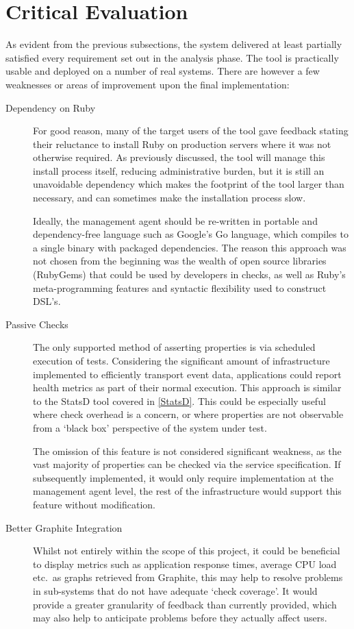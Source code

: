 \documentclass{cshonours}
\begin{document}
\pagebreak
\section{Critical Evaluation}

As evident from the previous subsections, the system delivered at least partially satisfied every requirement set out in the analysis phase. The tool is practically usable and deployed on a number of real systems. There are however a few weaknesses or areas of improvement upon the final implementation:

\begin{description}
  \item[Dependency on Ruby] For good reason, many of the target users of the tool gave feedback stating their reluctance to install Ruby on production servers where it was not otherwise required. As previously discussed, the tool will manage this install process itself, reducing administrative burden, but it is still an unavoidable dependency which makes the footprint of the tool larger than necessary, and can sometimes make the installation process slow.

    Ideally, the management agent should be re-written in portable and dependency-free language such as Google's Go language, which compiles to a single binary with packaged dependencies. The reason this approach was not chosen from the beginning was the wealth of open source libraries (RubyGems) that could be used by developers in checks, as well as Ruby's meta-programming features and syntactic flexibility used to construct DSL's.

  \item[Passive Checks] The only supported method of asserting properties is via scheduled execution of tests. Considering the significant amount of infrastructure implemented to efficiently transport event data, applications could report health metrics as part of their normal execution. This approach is similar to the StatsD tool covered in \autoref{StatsD}. This could be especially useful where check overhead is a concern, or where properties are not observable from a `black box' perspective of the system under test.

    The omission of this feature is not considered significant weakness, as the vast majority of properties can be checked via the service specification. If subsequently implemented, it would only require implementation at the management agent level, the rest of the infrastructure would support this feature without modification.

  \item[Better Graphite Integration] Whilst not entirely within the scope of this project, it could be beneficial to display metrics such as application response times, average CPU load etc.\ as graphs retrieved from Graphite, this may help to resolve problems in sub-systems that do not have adequate `check coverage'. It would provide a greater granularity of feedback than currently provided, which may also help to anticipate problems before they actually affect users.
\end{description}
\end{document}
